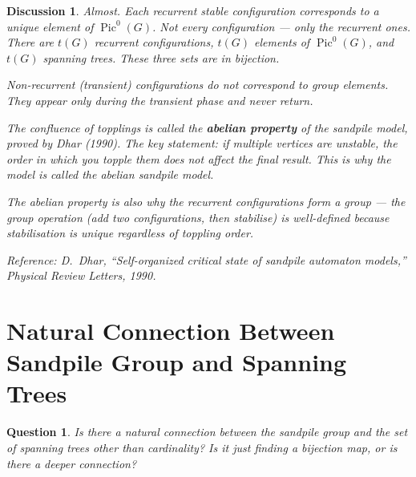 \documentclass[11pt]{article}
\newcommand{\Pic}{\operatorname{Pic}^0}
\newtheorem{question}{Question}
\newtheorem{answer}{Discussion}
\begin{document}
\begin{answer}
Almost. Each \emph{recurrent} stable configuration corresponds to a unique
element of $\Pic(G)$. Not every configuration --- only the recurrent ones.
There are $t(G)$ recurrent configurations, $t(G)$ elements of $\Pic(G)$, and
$t(G)$ spanning trees. These three sets are in bijection.

Non-recurrent (transient) configurations do not correspond to group elements.
They appear only during the transient phase and never return.

The confluence of topplings is called the \textbf{abelian property} of the
sandpile model, proved by Dhar (1990). The key statement: if multiple vertices
are unstable, the order in which you topple them does not affect the final
result. This is why the model is called the \emph{abelian} sandpile model.

The abelian property is also why the recurrent configurations form a group ---
the group operation (add two configurations, then stabilise) is well-defined
because stabilisation is unique regardless of toppling order.

Reference: D.~Dhar, ``Self-organized critical state of sandpile automaton
models,'' \emph{Physical Review Letters}, 1990.
\end{answer}


\section{Natural Connection Between Sandpile Group and Spanning Trees}

\begin{question}
Is there a natural connection between the sandpile group and the set of
spanning trees other than cardinality? Is it just finding a bijection map, or
is there a deeper connection?
\end{question}
\end{document}

